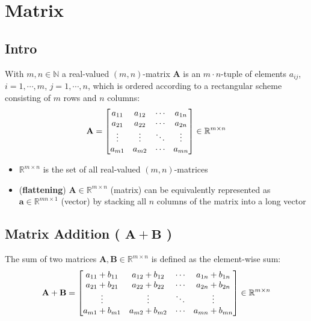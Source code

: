 \chapter{Matrix \cite{mfml-1}}\label{chapter: Matrix}

\section*{Intro \cite{mfml-1}}

With $m, n \in \mathbb{N}$ a real-valued $(m, n)$-matrix $\mathbf{A}$ is an $m\cdot n$-tuple of elements $a_{ij}$, $i = 1, \cdots , m$, $j = 1, \cdots , n$, which is ordered according to a rectangular scheme consisting of $m$ rows and $n$ columns:
\[
    \hfill
    \mathbf{A} = \begin{bmatrix}
        a_{11} & a_{12} & \cdots & a_{1n}\\
        a_{21} & a_{22} & \cdots & a_{2n}\\
        \vdots & \vdots & \ddots & \vdots\\
        a_{m1} & a_{m2} & \cdots & a_{mn}\\
    \end{bmatrix}
    \in \mathbb{R}^{m\times n}
    \hfill
\]

\begin{itemize}
    \item $\mathbb{R}^{m\times n}$ is the set of all real-valued $(m, n)$-matrices

    \item (\textbf{flattening}) $\mathbf{A} \in \mathbb{R}^{m\times n}$ (matrix) can be equivalently represented as $\mathbf{a} \in \mathbb{R}^{mn\times 1}$ (vector) by stacking all $n$ columns of the matrix into a long vector
\end{itemize}


\section{Matrix Addition ( $\mathbf{A + B}$ ) \cite{mfml-1}}\label{Matrix Addition}
The sum of two matrices $\mathbf{A, B} \in \mathbb{R}^{m\times n}$ is defined as the element-wise sum:
\[
    \hfill
    \mathbf{A + B} = \begin{bmatrix}
        a_{11} + b_{11} & a_{12} + b_{12} & \cdots & a_{1n} + b_{1n}\\
        a_{21} + b_{21} & a_{22} + b_{22} & \cdots & a_{2n} + b_{2n}\\
        \vdots & \vdots & \ddots & \vdots\\
        a_{m1} + b_{m1} & a_{m2} + b_{m2} & \cdots & a_{mn} + b_{mn}\\
    \end{bmatrix}
    \in \mathbb{R}^{m\times n}
    \hfill
\]


